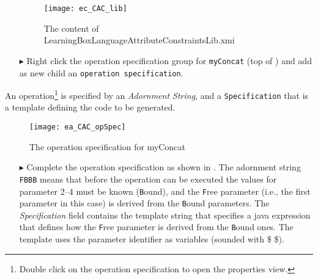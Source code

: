\begin{itemize}
\begin{figure}[htbp]
\begin{center}
  \texttt{[image: ec\_CAC\_lib]}
  \caption{The content of LearningBoxLanguageAttributeConstraintsLib.xmi}  
  \label{ec_CAC_lib}
\end{center}
\end{figure}
\item[$\blacktriangleright$] Right click the operation specification group for \texttt{myConcat} (top of ) and add as new child an \texttt{operation specification}. 
\end{itemize}

An operation\footnote{Double click on the operation specification to open the properties view.} is specified by an \emph{Adornment String}, and a \texttt{Specification} that is a template defining the code to be generated.

\begin{figure}[htbp]
\begin{center}
  \texttt{[image: ea\_CAC\_opSpec]}
  \caption{The operation specification for myConcat}  
  \label{ea_CAC_opSpec}
\end{center}
\end{figure}

\begin{itemize}
\item[$\blacktriangleright$] Complete the operation specification as shown in . The adornment string \texttt{FBBB} means that before the operation can be executed the values for parameter 2--4 must be known (\texttt{B}ound), and the \texttt{F}ree parameter (i.e., the first parameter in this case) is derived from the \texttt{B}ound parameters. The \emph{Specification} field contains the template string that specifies a java expression that defines how the \texttt{F}ree parameter is derived from the \texttt{B}ound ones. The template uses the parameter identifier as variables (sounded with \$ \$). 

\end{itemize}



\goodbreak
 
